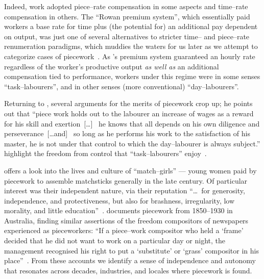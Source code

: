 \documentclass[trackingWork]{subfiles}
\begin{document}
Indeed, work adopted piece--rate compensation in some aspects and
time--rate compensation in others.
The ``Rowan premium system'',
which essentially paid workers
a base rate for time plus
(the potential for) an additional pay dependent on output,
was just one of several alternatives to stricter time-- and piece--rate renumeration paradigms, which
muddies the waters for us later as we attempt to categorize cases of piecework~\cite{rowan1901premium}.
As \citeauthor{rowan1901premium}'s premium system guaranteed an hourly rate
regardless of the worker's productive output
\textit{as well as} an additional compensation tied to performance,
workers under this regime were
in some senses ``task--labourers'', and
in other senses (more conventional) ``day--labourers''.

Returning to
\citeauthor{hughRaynbirdTaskWork}, several arguments for the merits of piecework
crop up; he points out that 
``piece work holds out to the labourer an increase of wages as a reward for his skill and exertion~[\dots]~
he knows that all depends on his own diligence and perseverance~[\dots and]~
so long as he performs his work to the satisfaction of his master,
he is not under that control to which the day--labourer is always subject.''
\citeauthor{hughRaynbirdTaskWork} highlight the freedom from control that ``task--labourers'' enjoy~\cite{hughRaynbirdTaskWork,rowan1901premium}.

\citeauthor{10.2307/3827491} offers a look into the lives and culture of ``match--girls''
--- young women paid by piecework to assemble matchsticks generally in the late  century.
Of particular interest was their independent nature, via their reputation ``\dots~for generosity, independence, and protectiveness,
but also for brashness, irregularity, low morality, and little education''~\cite{10.2307/3827491}.
\citeauthor{10.2307/27508091} documents piecework from 1850--1930 in Australia,
finding similar assertions of the freedom compositors of newspapers experienced as pieceworkers:
``If a piece--work compositor who held a `frame' decided that he did not want to work on a particular day or night,
the management recognised his right to put a `substitute' or `grass' compositor in his place''~\cite{10.2307/27508091}.
From these accounts we identify a sense of independence and autonomy that resonates across decades, industries, and locales where piecework is found.
\end{document}
